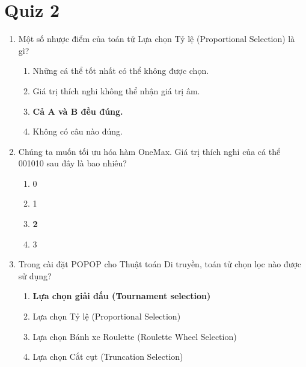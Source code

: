 \documentclass{book}
\begin{document}
\section{Quiz 2}

\begin{enumerate}
    \item Một số nhược điểm của toán tử Lựa chọn Tỷ lệ (Proportional Selection) là gì?
    \begin{multicols}{2}
        \begin{enumerate}[label=\Alph*]
            \item Những cá thể tốt nhất có thể không được chọn.
            \item Giá trị thích nghi không thể nhận giá trị âm.
            \item \textbf{Cả A và B đều đúng.}
            \item Không có câu nào đúng.
        \end{enumerate}
    \end{multicols}

    \item Chúng ta muốn tối ưu hóa hàm OneMax. Giá trị thích nghi của cá thể 001010 sau đây là bao nhiêu?
    \begin{multicols}{2}
        \begin{enumerate}[label=\Alph*]
            \item 0
            \item 1
            \item \textbf{2}
            \item 3
        \end{enumerate}
    \end{multicols}

    \item Trong cài đặt POPOP cho Thuật toán Di truyền, toán tử chọn lọc nào được sử dụng?
    \begin{multicols}{2}
        \begin{enumerate}[label=\Alph*]
            \item \textbf{Lựa chọn giải đấu (Tournament selection)}
            \item Lựa chọn Tỷ lệ (Proportional Selection)
            \item Lựa chọn Bánh xe Roulette (Roulette Wheel Selection)
            \item Lựa chọn Cắt cụt (Truncation Selection)
        \end{enumerate}
    \end{multicols}


\end{enumerate}
\end{document}
